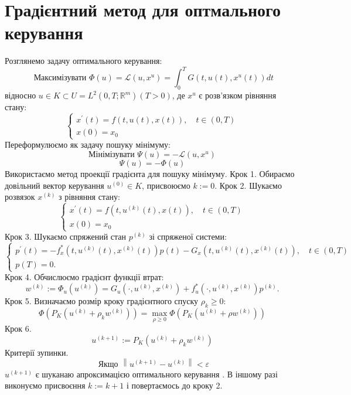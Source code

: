 \documentclass[a4paper,12pt]{extreport}
\begin{document}
\section{Градієнтний метод для оптмального керування} 
Розглянемо задачу оптимального керування:
\begin{equation} \label{eq:3_1}
\text { Максимізувати } \Phi(u)=\mathcal{L}\left(u, x^u\right)=\int_0^T G\left(t, u(t), x^u(t)\right) d t
\end{equation}
відносно $u \in K \subset U=L^2\left(0, T ; \mathbb{R}^m\right)(T>0)$, де $x^u$ є розв'язком рівняння стану:
\begin{equation} \label{eq:3_2}
\left\{\begin{array}{l}
x^{\prime}(t)=f(t, u(t), x(t)), \quad t \in(0, T) \\
x(0)=x_0
\end{array}\right.
\end{equation}
    Переформулюємо як задачу пошуку мінімуму:
$$
    \text{Мінімізувати } \Psi(u)=-\mathcal{L}\left(u, x^u\right)
$$
$$
    \Psi(u)=-\Phi(u)
$$
    Використаємо метод проекції градієнта для пошуку мінімуму.
    \newline
    Крок 1. Обираємо довільний вектор керування $u^{(0)} \in K$, присвоюємо $k:=0$.
    \newline
    Крок 2. Шукаємо розвязок $x^{(k)}$ з рівняння стану:
$$
    \left\{\begin{array}{l}
        x^{\prime}(t)=f\left(t, u^{(k)}(t), x(t)\right), \quad t \in(0, T) \\
        x(0)=x_0
    \end{array}\right.
$$
\newline
    Крок 3. Шукаємо спряжений стан $p^{(k)}$ зі спряженої системи:
$$
    \left\{\begin{array}{l}
        p^{\prime}(t)=-f_x^*\left(t, u^{(k)}(t), x^{(k)}(t)\right) p(t)-G_x\left(t, u^{(k)}(t), x^{(k)}(t)\right), \quad t \in(0, T) \\
        p(T)=0 .
    \end{array}\right.
$$
\newline
    Крок 4. Обчислюємо градієнт функції втрат:
$$
    w^{(k)}:=\Phi_u\left(u^{(k)}\right)=G_u\left(\cdot, u^{(k)}, x^{(k)}\right)+f_u^*\left(\cdot, u^{(k)}, x^{(k)}\right) p^{(k)} .
$$
\newline
    Крок 5. Визначаємо розмір кроку градієнтного спуску $\rho_k \geq 0$:
$$
    \Phi\left(P_K\left(u^{(k)}+\rho_k w^{(k)}\right)\right)=\max _{\rho \geq 0} \Phi\left(P_K\left(u^{(k)}+\rho w^{(k)}\right)\right)
$$
\newline
Крок 6. 
$$
    u^{(k+1)}:=P_K\left(u^{(k)}+\rho_k w^{(k)}\right)
$$
Критерії зупинки.
$$
    \text { Якщо }\left\|u^{(k+1)}-u^{(k)}\right\|<\varepsilon
$$
$u^{(k+1)} \text { є шуканаю апроксимацією оптимального керування }$. В іншому разі виконуємо присвоєння $k:=k+1$ і повертаємось до кроку 2.
\end{document}

